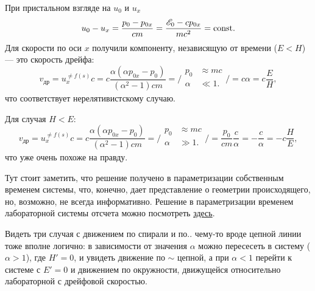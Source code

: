 При пристальном взгляде на $u_0$ и $u_x$ 
\begin{equation*}
	u_0 - u_x = \frac{p_0 - p_{0x}}{cm} = 
	\frac{\mathscr{E}_0 - c p_{0x}}{m c^2}
	=
	\text{const}.
\end{equation*}
Для скорости по оси $x$ получили компоненту, независящую от времени ($E < H$) --- это скорость дрейфа:
\begin{equation*}
	v_{\text{др}} = u_x^{\neq f(s)} c  = c
	\frac{\alpha  (\alpha  p_{0x}-p_0)}{\left(\alpha ^2-1\right) c m} = 
	\bigg/
	\begin{aligned}
	    p_0 &\approx m c\\
	    \alpha &\ll 1. \\
	\end{aligned}
	\bigg/ = c \alpha = c \frac{E}{H},
\end{equation*}
что соответствует нерелятивистскому случаю.

Для случая $H < E$:
\begin{equation*}
	v_{\text{др}} = u_x^{\neq f(s)} c  = c
	\frac{\alpha  (\alpha  p_{0x}-p_0)}{\left(\alpha ^2-1\right) c m} = 
	\bigg/
	\begin{aligned}
	    p_0 &\approx m c\\
	    \alpha &\gg 1. \\
	\end{aligned}
	\bigg/ = \frac{p_0}{cm} \frac{c}{\alpha} = 
	 -\frac{c}{\alpha} = -c \frac{H}{E},
\end{equation*}
что уже очень похоже на правду.

Тут стоит заметить, что решение получено в параметризации собственным временем системы, что, конечно, дает представление о геометрии происходящего, но, возможно, не всегда информативно. Решение в параметризации временем лабораторной системы отсчета можно посмотреть \href{http://www.mathnet.ru/links/fceb55e262fb1ac3ee2fb2b02d884543/tmf8881.pdf}{здесь}. 

Видеть три случая с движением по спирали и по.. чему-то вроде цепной линии тоже вполне логично: в зависимости от значения $\alpha$ можно пересесеть в систему ($\alpha > 1$), где $H' = 0$, и увидеть движение по $\sim$ цепной, а при $\alpha < 1$ перейти к системе с $E'=0$ и движением по окружности, движущейся относительно лабораторной с дрейфовой скоростью. 


